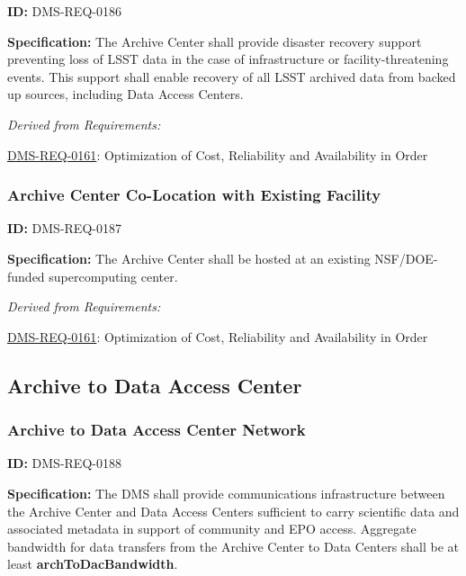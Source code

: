 \documentclass[SE,toc,lsstdraft]{lsstdoc}
\begin{document}
\label{DMS-REQ-0186}
\textbf{ID:} DMS-REQ-0186

\textbf{Specification:} The Archive Center shall provide disaster recovery support preventing loss of LSST data in the case of infrastructure or facility-threatening events.  This support shall enable recovery of all LSST archived data from backed up sources, including Data Access Centers.






\emph{Derived from Requirements:}

\hyperref[DMS-REQ-0161]{DMS-REQ-0161}:
Optimization of Cost, Reliability and Availability in Order \newline


\subsubsection{Archive Center Co-Location with Existing Facility}

\label{DMS-REQ-0187}
\textbf{ID:} DMS-REQ-0187

\textbf{Specification:} The Archive Center shall be hosted at an existing NSF/DOE-funded supercomputing center.






\emph{Derived from Requirements:}

\hyperref[DMS-REQ-0161]{DMS-REQ-0161}:
Optimization of Cost, Reliability and Availability in Order \newline


\subsection{Archive to Data Access Center}





\subsubsection{Archive to Data Access Center Network}

\label{DMS-REQ-0188}
\textbf{ID:} DMS-REQ-0188

\textbf{Specification:} The DMS shall provide communications infrastructure between the Archive Center and Data Access Centers sufficient to carry scientific data and associated metadata in support of community and EPO access. Aggregate bandwidth for data transfers from the Archive Center to Data Centers shall be at least \textbf{archToDacBandwidth}.
\end{document}
